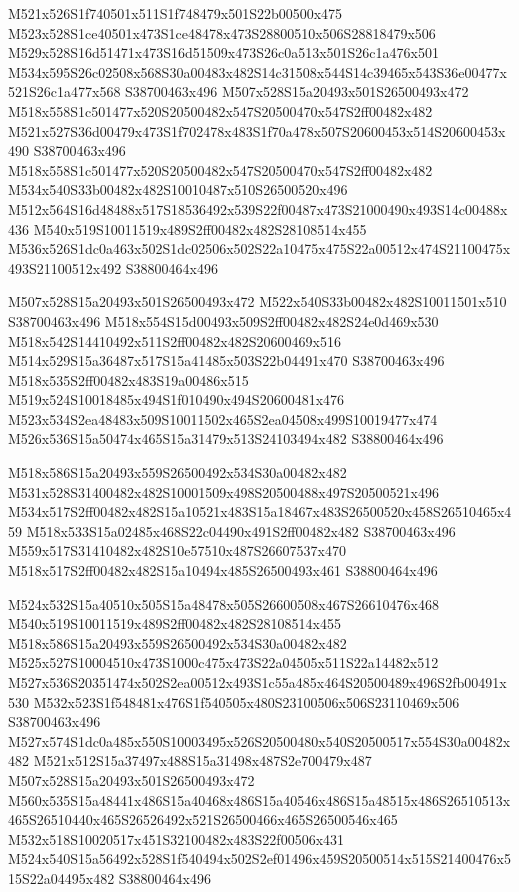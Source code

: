 \documentclass{article}
\begin{document}
\begin{multicols}{2}
M521x526S1f740501x511S1f748479x501S22b00500x475 M523x528S1ce40501x473S1ce48478x473S28800510x506S28818479x506 M529x528S16d51471x473S16d51509x473S26c0a513x501S26c1a476x501 M534x595S26c02508x568S30a00483x482S14c31508x544S14c39465x543S36e00477x521S26c1a477x568 S38700463x496 M507x528S15a20493x501S26500493x472 M518x558S1c501477x520S20500482x547S20500470x547S2ff00482x482 M521x527S36d00479x473S1f702478x483S1f70a478x507S20600453x514S20600453x490 S38700463x496 M518x558S1c501477x520S20500482x547S20500470x547S2ff00482x482 M534x540S33b00482x482S10010487x510S26500520x496 M512x564S16d48488x517S18536492x539S22f00487x473S21000490x493S14c00488x436 M540x519S10011519x489S2ff00482x482S28108514x455 M536x526S1dc0a463x502S1dc02506x502S22a10475x475S22a00512x474S21100475x493S21100512x492 S38800464x496

M507x528S15a20493x501S26500493x472 M522x540S33b00482x482S10011501x510 S38700463x496 M518x554S15d00493x509S2ff00482x482S24e0d469x530 M518x542S14410492x511S2ff00482x482S20600469x516 M514x529S15a36487x517S15a41485x503S22b04491x470 S38700463x496 M518x535S2ff00482x483S19a00486x515 M519x524S10018485x494S1f010490x494S20600481x476 M523x534S2ea48483x509S10011502x465S2ea04508x499S10019477x474 M526x536S15a50474x465S15a31479x513S24103494x482 S38800464x496

M518x586S15a20493x559S26500492x534S30a00482x482 M531x528S31400482x482S10001509x498S20500488x497S20500521x496 M534x517S2ff00482x482S15a10521x483S15a18467x483S26500520x458S26510465x459 M518x533S15a02485x468S22c04490x491S2ff00482x482 S38700463x496 M559x517S31410482x482S10e57510x487S26607537x470 M518x517S2ff00482x482S15a10494x485S26500493x461 S38800464x496

M524x532S15a40510x505S15a48478x505S26600508x467S26610476x468 M540x519S10011519x489S2ff00482x482S28108514x455 M518x586S15a20493x559S26500492x534S30a00482x482 M525x527S10004510x473S1000c475x473S22a04505x511S22a14482x512 M527x536S20351474x502S2ea00512x493S1c55a485x464S20500489x496S2fb00491x530 M532x523S1f548481x476S1f540505x480S23100506x506S23110469x506 S38700463x496 M527x574S1dc0a485x550S10003495x526S20500480x540S20500517x554S30a00482x482 M521x512S15a37497x488S15a31498x487S2e700479x487 M507x528S15a20493x501S26500493x472 M560x535S15a48441x486S15a40468x486S15a40546x486S15a48515x486S26510513x465S26510440x465S26526492x521S26500466x465S26500546x465 M532x518S10020517x451S32100482x483S22f00506x431 M524x540S15a56492x528S1f540494x502S2ef01496x459S20500514x515S21400476x515S22a04495x482 S38800464x496


\end{multicols}
\end{document}
